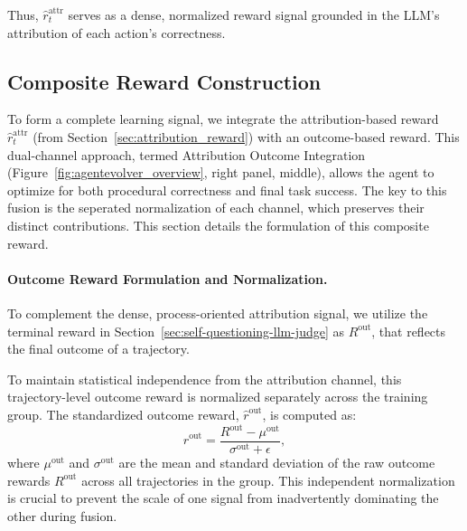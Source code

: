 Thus, $\hat{r}^{\text{attr}}_t$ serves as a dense, normalized reward signal grounded in the LLM's attribution of each action's correctness.






\subsection{Composite Reward Construction}
\label{sec:attribution_integration}

To form a complete learning signal, we integrate the attribution-based reward $\hat{r}^{\text{attr}}_t$ (from Section~\ref{sec:attribution_reward}) with an outcome-based reward. This dual-channel approach, termed Attribution Outcome Integration (Figure~\ref{fig:agentevolver_overview}, right panel, middle), allows the agent to optimize for both procedural correctness and final task success. The key to this fusion is the seperated normalization of each channel, which preserves their distinct contributions. This section details the formulation of this composite reward.


\paragraph{Outcome Reward Formulation and Normalization.}
To complement the dense, process-oriented attribution signal, we utilize the terminal reward in Section~\ref{sec:self-questioning-llm-judge} as $R^{\text{out}}$, that reflects the final outcome of a trajectory. 

To maintain statistical independence from the attribution channel, this trajectory-level outcome reward is normalized separately across the training group. The standardized outcome reward, $\hat{r}^{\text{out}}$, is computed as:
\begin{equation}
    \hat{r}^{\text{out}} = \frac{R^{\text{out}} - \mu^{\text{out}}}{\sigma^{\text{out}} + \epsilon},
\end{equation}
where $\mu^{\text{out}}$ and $\sigma^{\text{out}}$ are the mean and standard deviation of the raw outcome rewards $R^{\text{out}}$ across all trajectories in the group.
This independent normalization is crucial to prevent the scale of one signal from inadvertently dominating the other during fusion.

